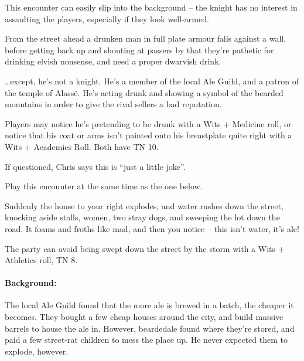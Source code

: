 \begin{multicols}{2}

This encounter can easily slip into the background -- the knight has no interest in assaulting the players, especially if they look well-armed.

\begin{boxtext}

	From the street ahead a drunken man in full plate armour falls against a wall, before getting back up and shouting at passers by that they're pathetic for drinking elvish nonsense, and need a proper dwarvish drink.

\end{boxtext}

\ldots except, he's not a knight.
He's a member of the local Ale Guild, and a patron of the temple of Alass\"{e}.
He's acting drunk and showing a symbol of the bearded mountains in order to give the rival sellers a bad reputation.

Players may notice he's pretending to be drunk with a Wits + Medicine roll, or notice that his coat or arms isn't painted onto his breastplate quite right with a Wits + Academics Roll.  Both have TN 10.



If questioned, Chris says this is ``just a little joke''.


Play this encounter at the same time as the one below.

\begin{boxtext}
	Suddenly the house to your right explodes, and water rushes down the street, knocking aside stalls, women, two stray dogs, and sweeping the lot down the road.  It foams and froths like mad, and then you notice -- this isn't water, it's ale!
\end{boxtext}

The party can avoid being swept down the street by the storm with a Wits + Athletics roll, TN 8.

\paragraph{Background:} The local Ale Guild found that the more ale is brewed in a batch, the cheaper it becomes.  They bought a few cheap houses around the city, and build massive barrels to house the ale in.  However, \gls{beardedale} found where they're stored, and paid a few street-rat children to mess the place up.  He never expected them to explode, however.


\end{multicols}
